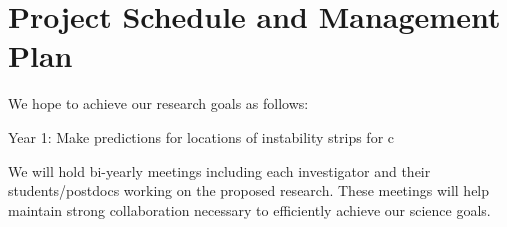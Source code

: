 \section{Project Schedule and Management Plan}

We hope to achieve our research goals as follows:

Year 1: Make predictions for locations of instability strips for c 

We will  hold bi-yearly meetings including each investigator and their students/postdocs working on the proposed research. These meetings will help maintain strong collaboration necessary to efficiently achieve our science goals.
